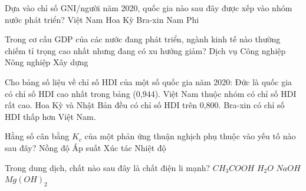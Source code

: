 \begin{ex}
    Dựa vào chỉ số GNI/người năm 2020, quốc gia nào sau đây được xếp vào nhóm nước phát triển?
    \choice
    {Việt Nam}
    {\True Hoa Kỳ}
    {Bra-xin}
    {Nam Phi}

\end{ex}
\begin{ex}
    Trong cơ cấu GDP của các nước đang phát triển, ngành kinh tế nào thường chiếm tỉ trọng cao nhất nhưng đang có xu hướng giảm?
    \choice
    {Dịch vụ}
    {Công nghiệp}
    {\True Nông nghiệp}
    {Xây dựng}

\end{ex}
\begin{ex}
    Cho bảng số liệu về chỉ số HDI của một số quốc gia năm 2020:
    \choiceTF
    {\True Đức là quốc gia có chỉ số HDI cao nhất trong bảng (0,944).}
    {Việt Nam thuộc nhóm có chỉ số HDI rất cao.}
    {\True Hoa Kỳ và Nhật Bản đều có chỉ số HDI trên 0,800.}
    {Bra-xin có chỉ số HDI thấp hơn Việt Nam.}

\end{ex}
\begin{ex}
    Hằng số cân bằng $K_c$ của một phản ứng thuận nghịch phụ thuộc vào yếu tố nào sau đây?
    \choice
    {Nồng độ}
    {Áp suất}
    {Xúc tác}
    {\True Nhiệt độ}

\end{ex}
\begin{ex}
    Trong dung dịch, chất nào sau đây là chất điện li mạnh?
    \choice
    {$CH_3COOH$}
    {$H_2O$}
    {\True $NaOH$}
    {$Mg(OH)_2$}

\end{ex}
